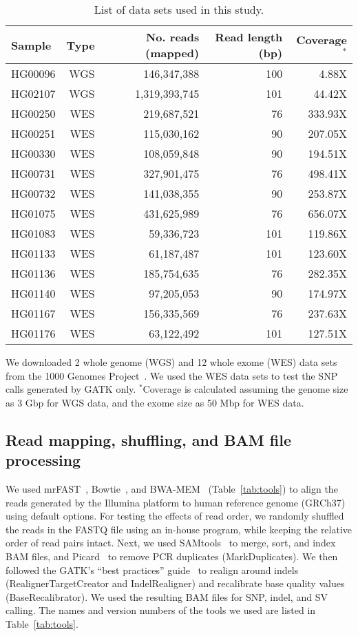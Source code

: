 \documentclass[10pt,a4paper]{article}
\begin{document}
\begin{table}[htb]
\caption{List of data sets used in this study.}
\begin{center}
\begin{tabular}{|l|r|r|r|r|}
\hline
{\bf Sample} & {\bf Type} & {\bf No. reads (mapped)} & {\bf Read length (bp)} & {\bf Coverage$^*$}\\
\hline
HG00096 & WGS & 146,347,388 & 100 & 4.88X\\
HG02107 & WGS & 1,319,393,745 & 101 & 44.42X\\
\hline
HG00250 & WES & 219,687,521 & 76 & 333.93X \\ 
HG00251 & WES & 115,030,162 & 90 & 207.05X \\ 
HG00330 & WES & 108,059,848 & 90 & 194.51X \\ 
HG00731 & WES & 327,901,475 & 76 & 498.41X \\ 
HG00732 & WES & 141,038,355 & 90 & 253.87X \\ 
HG01075 & WES & 431,625,989 & 76 & 656.07X \\ 
HG01083 & WES & 59,336,723 & 101 & 119.86X \\ 
HG01133 & WES & 61,187,487 & 101 & 123.60X \\ 
HG01136 & WES & 185,754,635 & 76 & 282.35X \\ 
HG01140 & WES & 97,205,053 & 90 & 174.97X \\ 
HG01167 & WES & 156,335,569 & 76 & 237.63X \\ 
HG01176 & WES & 63,122,492 & 101 & 127.51X \\ 
\hline
\end{tabular}
\end{center}
{\footnotesize We downloaded 2 whole genome (WGS) and 12 whole exome (WES) data sets from the 1000 Genomes Project~\cite{1000GP2012}. We
  used the WES data sets to test the SNP calls generated by GATK only.
  $^*$Coverage is calculated assuming the genome size as 3 Gbp for WGS data, and the exome size as 50 Mbp for WES data.}
\label{tab:data}
\end{table}


\subsection{Read mapping, shuffling, and BAM file processing}
We used mrFAST~\cite{Alkan2009,Xin2013}, Bowtie~\cite{Langmead2009}, and BWA-MEM~\cite{Li2009a,Li2013} (Table~\ref{tab:tools}) to align the reads generated by the Illumina 
platform to human reference genome (GRCh37) using default options. For testing the effects of read order, we randomly 
shuffled the reads in the FASTQ file using an in-house program, while keeping the relative order of read pairs intact.
Next, we used SAMtools~\cite{Li2009b} to merge, sort, and index BAM files, and Picard~\cite{picard} to remove PCR duplicates (MarkDuplicates).
We then followed the GATK's ``best practices'' guide~\cite{VanderAuwera2013} to
realign around indels (RealignerTargetCreator and IndelRealigner) and recalibrate base quality values (BaseRecalibrator). We used the 
resulting BAM files for SNP, indel, and SV calling. The names and version numbers of the tools we used are listed in Table~\ref{tab:tools}.
\end{document}

